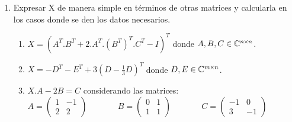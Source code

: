 \documentclass[a4paper]{article}
\newcommand{\exercise}{\item}
\begin{document}
\begin{enumerate}
\begin{enumerate} [label=(\alph*)]
		\item Dada $A \in \mathbb{C}^{n \hspace{-0.2mm}\times \hspace{-0.2mm} n}$, la matriz $A.A^T$ es simétrica.
		\item Dadas $A,B \in \mathbb{C}^{n \hspace{-0.2mm}\times \hspace{-0.2mm} n}$, la matriz $A.B+B^T.A^T$ es simétrica.
		\item Dadas $A,B \in \mathbb{C}^{n \hspace{-0.2mm}\times \hspace{-0.2mm} n}$, la matriz $A.B+B^T.A^T$ es simétrica.
		\item Dadas $A,B \in \mathbb{C}^{n \hspace{-0.2mm}\times \hspace{-0.2mm} n}$, si $A$ es simétrica la matriz entonces $B^T. A. B$ también es simétrica.
		\item Dadas $A,B \in \mathbb{C}^{n \hspace{-0.2mm}\times \hspace{-0.2mm} n}$, si $A$ es idempotente entonces $(A-I)^2=I-A$
		\item Dadas $A,B \in \mathbb{C}^{n \hspace{-0.2mm}\times \hspace{-0.2mm} n}$, si $A$ y $B$ no son singulares, entonces $(A.B)^{-1}=B^{-1}. A^{-1}$
	\end{enumerate}
	\exercise Expresar X de manera simple en términos de otras matrices y calcularla en los casos donde se den los datos necesarios. 
	\begin{enumerate} [label=(\alph*)]
		\item $X=\left( A^T . B^T + 2. A^T . (B^T)^T .C^T - I \right)^T$ donde $A,B,C \in \mathbb{C}^{n \hspace{-0.2mm}\times \hspace{-0.2mm} n}$.
		\item $X=-D^T - E^T + 3 \left( D - \frac{1}{3} D\right)^T$ donde $D,E \in \mathbb{C}^{m \hspace{-0.2mm}\times \hspace{-0.2mm} n}$.
		\item $X.A-2B=C$ considerando las matrices: \\ $A=\left( \begin{matrix} 1 & -1 \\ 2 & 2\end{matrix} \right)$ ~~~~~~ $B=\left( \begin{matrix} 0 & 1 \\ 1 & 1\end{matrix} \right)$ ~~~~~~ $C=\left( \begin{matrix} -1 & 0 \\ 3 & -1 \end{matrix} \right)$

\end{enumerate}
\end{enumerate}
\end{document}
